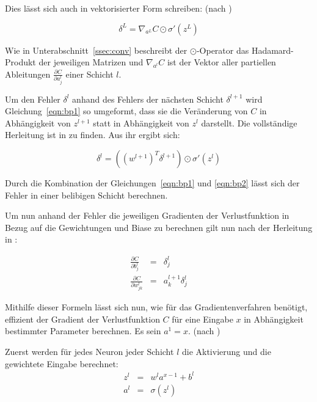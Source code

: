 Dies lässt sich auch in vektorisierter Form schreiben: (nach \cite[Kap.~2]{nielsen_15})

\begin{equation}
\label{eqn:bp1}
\delta^L = \nabla_{a^L} C\odot\sigma'\left(z^L\right)
\end{equation}

Wie in Unterabschnitt~\ref{ssec:conv} beschreibt der $\odot$-Operator das Hadamard-Produkt der jeweiligen Matrizen und $\nabla_{a^l} C$ ist der Vektor aller partiellen Ableitungen $\frac{\partial C}{\partial a_j^l}$ einer Schicht $l$.

Um den Fehler $\delta^l$  anhand des Fehlers der nächsten Schicht $\delta^{l+1}$ wird Gleichung~\ref{eqn:bp1} so umgeformt, dass sie die Veränderung von $C$ in Abhängigkeit von $z^{l+1}$ statt in Abhängigkeit von $z^{l}$ darstellt. Die vollständige Herleitung ist in \cite[Kap.~2]{kathuria_18} zu finden. Aus ihr ergibt sich:

\begin{equation}
\label{eqn:bp2}
\delta^l =\left(\left(w^{l+1}\right)^T\delta^{l+1}\right)\odot\sigma'\left(z^l\right)
\end{equation}

Durch die Kombination der Gleichungen~\ref{eqn:bp1} und \ref{eqn:bp2} lässt sich der Fehler in einer belibigen Schicht berechnen.

Um nun anhand der Fehler die jeweiligen Gradienten der Verlustfunktion in Bezug auf die Gewichtungen und Biase zu berechnen gilt nun nach der Herleitung in \cite[Kap.~2]{kathuria_18}:

\begin{eqnarray}
\label{eqn:bp3}
\frac{\partial C}{\partial b_j^l} &=& \delta_j^l\\
\label{eqn:bp4}
\frac{\partial C}{\partial w_{jk}^l} &=& a_k^{l+1}\delta_j^l
\end{eqnarray}

Mithilfe dieser Formeln lässt sich nun, wie für das Gradientenverfahren benötigt, effizient der Gradient der Verlustfunktion $C$ für eine Eingabe $x$ in Abhängigkeit bestimmter Parameter berechnen. Es sein $a^1=x$. (nach \cite[Kap.~2]{nielsen_15})

Zuerst werden für jedes Neuron jeder Schicht $l$ die Aktivierung und die gewichtete Eingabe berechnet:
\begin{eqnarray}
z^{l}&=& w^{l}a^{x-1}+b^l\\
a^{l}&=&\sigma\left(z^{l}\right)
\end{eqnarray}

